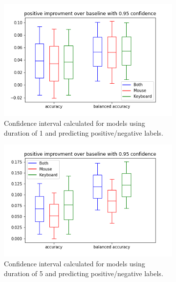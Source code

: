 \documentclass[../main.tex]{subfiles}
\begin{document}
\begin{figure}[!h]
    \begin{subfigure}[b]{0.31\textwidth}
        \centering
        \includegraphics[width=\textwidth]{figures/results/interval_difference/1/1_positive_0.95.png}
        \captionsetup{justification=centering}
        \caption{Confidence interval calculated for models using duration of 1 and predicting positive/negative labels.}
    \end{subfigure}
    \hfill
    \begin{subfigure}[b]{0.31\textwidth}
        \centering
        \includegraphics[width=\textwidth]{figures/results/interval_difference/5/5_positive_0.95.png}
        \captionsetup{justification=centering}
        \caption{Confidence interval calculated for models using duration of 5 and predicting positive/negative labels.}
    \end{subfigure}
    \begin{subfigure}[b]{0.31\textwidth}

\end{subfigure}
\end{figure}
\end{document}
